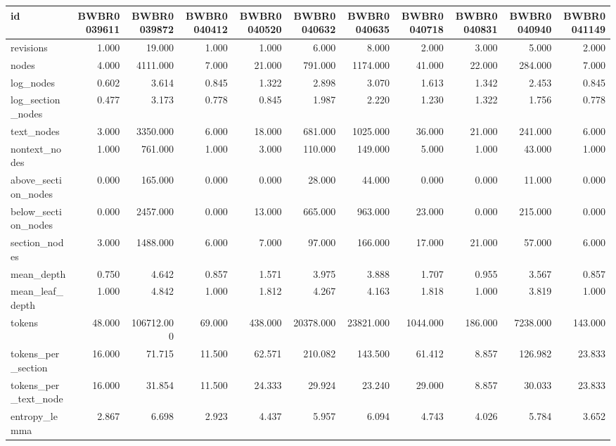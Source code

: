 \begin{tabular}{lrrrrrrrrrr}
\toprule
id & BWBR0039611 & BWBR0039872 & BWBR0040412 & BWBR0040520 & BWBR0040632 & BWBR0040635 & BWBR0040718 & BWBR0040831 & BWBR0040940 & BWBR0041149 \\
\midrule
revisions & 1.000 & 19.000 & 1.000 & 1.000 & 6.000 & 8.000 & 2.000 & 3.000 & 5.000 & 2.000 \\
\cline{1-11}
nodes & 4.000 & 4111.000 & 7.000 & 21.000 & 791.000 & 1174.000 & 41.000 & 22.000 & 284.000 & 7.000 \\
\cline{1-11}
log\_nodes & 0.602 & 3.614 & 0.845 & 1.322 & 2.898 & 3.070 & 1.613 & 1.342 & 2.453 & 0.845 \\
\cline{1-11}
log\_section\_nodes & 0.477 & 3.173 & 0.778 & 0.845 & 1.987 & 2.220 & 1.230 & 1.322 & 1.756 & 0.778 \\
\cline{1-11}
text\_nodes & 3.000 & 3350.000 & 6.000 & 18.000 & 681.000 & 1025.000 & 36.000 & 21.000 & 241.000 & 6.000 \\
\cline{1-11}
nontext\_nodes & 1.000 & 761.000 & 1.000 & 3.000 & 110.000 & 149.000 & 5.000 & 1.000 & 43.000 & 1.000 \\
\cline{1-11}
above\_section\_nodes & 0.000 & 165.000 & 0.000 & 0.000 & 28.000 & 44.000 & 0.000 & 0.000 & 11.000 & 0.000 \\
\cline{1-11}
below\_section\_nodes & 0.000 & 2457.000 & 0.000 & 13.000 & 665.000 & 963.000 & 23.000 & 0.000 & 215.000 & 0.000 \\
\cline{1-11}
section\_nodes & 3.000 & 1488.000 & 6.000 & 7.000 & 97.000 & 166.000 & 17.000 & 21.000 & 57.000 & 6.000 \\
\cline{1-11}
mean\_depth & 0.750 & 4.642 & 0.857 & 1.571 & 3.975 & 3.888 & 1.707 & 0.955 & 3.567 & 0.857 \\
\cline{1-11}
mean\_leaf\_depth & 1.000 & 4.842 & 1.000 & 1.812 & 4.267 & 4.163 & 1.818 & 1.000 & 3.819 & 1.000 \\
\cline{1-11}
tokens & 48.000 & 106712.000 & 69.000 & 438.000 & 20378.000 & 23821.000 & 1044.000 & 186.000 & 7238.000 & 143.000 \\
\cline{1-11}
tokens\_per\_section & 16.000 & 71.715 & 11.500 & 62.571 & 210.082 & 143.500 & 61.412 & 8.857 & 126.982 & 23.833 \\
\cline{1-11}
tokens\_per\_text\_node & 16.000 & 31.854 & 11.500 & 24.333 & 29.924 & 23.240 & 29.000 & 8.857 & 30.033 & 23.833 \\
\cline{1-11}
entropy\_lemma & 2.867 & 6.698 & 2.923 & 4.437 & 5.957 & 6.094 & 4.743 & 4.026 & 5.784 & 3.652 \\

\end{tabular}
